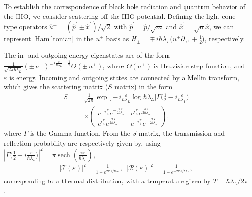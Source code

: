 \documentclass[prl,twocolumn,superscriptaddress,floatfix,showpacs,amsmath,longbibliography,nofootinbib,amssymb]{revtex4-1}
\newcommand{\col}[1]{\textcolor{red}{#1}}
\newcommand{\colp}[1]{\textcolor{purple}{#1}}
\newcommand{\bea}{\begin{eqnarray}}
\newcommand{\ea}{\end{eqnarray}}
\DeclareMathOperator{\sech}{sech}
\begin{document}
To establish the correspondence of black hole radiation and quantum behavior 
of the IHO, we consider scattering off the IHO potential. 
Defining the light-cone-type 
operators $\hat{u}^\pm=(\hat{p}^\prime\pm\hat{x}^\prime)/\sqrt{2}$ with $\hat{p}^\prime=\hat{p}/\sqrt{m}$ and $\hat{x}^\prime=\sqrt{\alpha}\hat{x}$, we can represent 
\eqref{Hamiltonian} in the $u^\pm$ basis as $H_\pm=\mp\,i\hbar\lambda_L\big(u^\pm\partial_{u^\pm}+\frac{1}{2}\big)$, respectively. 

The in- and outgoing energy eigenstates 
are of the form $\frac{1}{\sqrt{2\pi\hbar\lambda_L}}(\pm\,u^\pm)^{\pm\,i\frac{\varepsilon}{\hbar\lambda_L}-\frac{1}{2}}\Theta(\pm\,u^\pm)$, where $\Theta(u^\pm)$ is Heaviside step function, and $\varepsilon$ is energy. 
Incoming and outgoing
states are connected by a Mellin transform, which gives the scattering matrix ($S$ matrix) 
in the form \cite{Betzios, Maldacena_2005} 
\begin{eqnarray}\label{S-Matrix}
\nonumber
S&=&\frac{1}{\sqrt{2\pi}}\exp\bigg[-i\frac{\varepsilon}{\hbar\lambda_L}\log\hbar\lambda_L\bigg]\Gamma\bigg(\frac{1}{2}-i\frac{\varepsilon}{\hbar\lambda_L}\bigg)
\\    \nonumber
&&\times
\left(
\begin{array}{cccc}
e^{-i\frac{\pi}{4}}e^{-\frac{\pi\,\varepsilon}{2\hbar\lambda_L}} & e^{i\frac{\pi}{4}}e^{\frac{\pi\,\varepsilon}{2\hbar\lambda_L}}
\\
e^{i\frac{\pi}{4}}e^{\frac{\pi\,\varepsilon}{2\hbar\lambda_L}} & e^{-i\frac{\pi}{4}}e^{-\frac{\pi\,\varepsilon}{2\hbar\lambda_L}}
\end{array}
\right), \label{Smatrix} 
\end{eqnarray}
where $\Gamma$ is the Gamma function. From the $S$ matrix, the transmission and reflection probability are respectively given by, using 
$|\Gamma\big(\frac{1}{2}-i\frac{\varepsilon}{\hbar\lambda_L}\big)|^2=\pi\sech(\frac{\pi\varepsilon}{\hbar\lambda_L})$, 
\begin{eqnarray}\label{TR}
|{\mathcal T}(\varepsilon)|^2=\frac{1}{1+e^{2\pi\,\varepsilon/\hbar\lambda_L}},~~|{\mathcal R}(\varepsilon)|^2=\frac{1}{1+e^{-2\pi\,\varepsilon/\hbar\lambda_L}}, \label{TandR}
\end{eqnarray}
corresponding to a thermal distribution, with a temperature given by $T=\hbar\lambda_L/2\pi$. 
\end{document}
